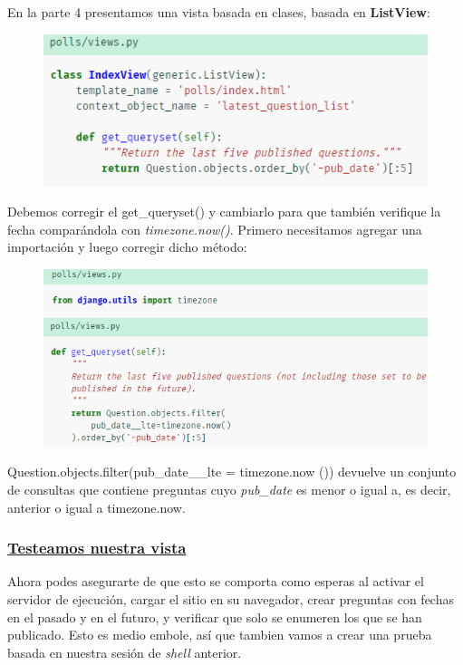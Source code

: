 \documentclass[10pt]{article}
\begin{document}
En la parte 4 presentamos una vista basada en clases, basada en \textbf{ListView}:
\begin{figure}[H]
\begin{center}
\includegraphics[scale=1]{figuras/3/35/357/img4.png}
\end{center}
\end{figure}
Debemos corregir el \textcolor{G}{get\_queryset()}
 y cambiarlo para que también verifique la fecha comparándola con \textit{timezone.now()}. Primero necesitamos agregar una importación y luego corregir dicho método:
\begin{figure}[H]
\begin{center}
\includegraphics[scale=1]{figuras/3/35/357/img5.png}
\end{center}
\end{figure}
\textcolor{G}{Question.objects.filter(pub\_date\_\_lte = timezone.now ())} devuelve un conjunto de consultas que contiene preguntas cuyo \textit{pub\_date} es menor o igual a, es decir, anterior o igual a \textcolor{G}{timezone.now}.

\subsubsection*{\underline{Testeamos nuestra vista}}
Ahora podes asegurarte de que esto se comporta como esperas al activar el servidor de ejecución, cargar el sitio en su navegador, crear preguntas con fechas en el pasado y en el futuro, y verificar que solo se enumeren los que se han publicado. Esto es medio embole, así que tambien vamos a crear una prueba basada en nuestra sesión de \textit{shell} anterior.
\end{document}
